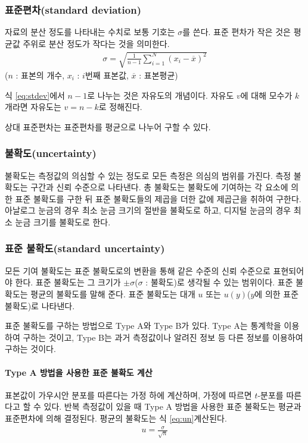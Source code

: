 \documentclass{GSHS-chemexp}
\begin{document}
	\subsubsection{\boldmath 표준편차(standard deviation)}
	자료의 분산 정도를 나타내는 수치로 보통 기호는 $\sigma$를 쓴다.
	표준 편차가 작은 것은 평균값 주위로 분산 정도가 작다는 것을 의미한다.
	\begin{gather}
	\sigma = \sqrt{
		\frac{1}{n-1}\sum_{i=1}^{N}(x_{i}-\overline{x})^{2}
	} \label{eq:stdev}
	\end{gather}
	($n$ : 표본의 개수, $x_{i}$ : $i$번째 표본값,
	$\overline{x}$ : 표본평균)
	
	식 \ref{eq:stdev}에서 $n-1$로 나누는 것은 자유도의 개념이다.
	자유도 $v$에 대해 모수가 $k$개라면 자유도는 $v = n - k$로 정해진다.
	\cite{deg_free}
	
	상대 표준편차는 표준편차를 평균으로 나누어 구할 수 있다.
	
	\subsubsection{불확도(uncertainty)}
	불확도는 측정값의 의심할 수 있는 정도로
	모든 측정은 의심의 범위를 가진다.
	측정 불확도는 구간과 신뢰 수준으로 나타낸다.
	총 불확도는 불확도에 기여하는 각 요소에 의한 표준 불확도를 구한 뒤
	표준 불확도들의 제곱을 더한 값에 제곱근을 취하여 구한다.
	\cite{Stephanie_Bell}
	아날로그 눈금의 경우 최소 눈금 크기의 절반을 불확도로 하고,
	디지털 눈금의 경우 최소 눈금 크기를 불확도로 한다.
	
	\subsubsection{표준 불확도(standard uncertainty)}
	모든 기여 불확도는 표준 불확도로의 변환을 통해 같은 수준의 신뢰 수준으로
	표현되어야 한다. 표준 불확도는 그 크기가 $\pm\sigma$($\sigma$ : 불확도)로
	생각될 수 있는 범위이다. 표준 불확도는 평균의 불확도를 말해 준다.
	표준 불확도는 대개 $u$ 또는 $u(y)$($y$에 의한 표준 불확도)로 나타낸다.
	
	표준 불확도를 구하는 방법으로 Type A와 Type B가 있다.
	Type A는 통계학을 이용하여 구하는 것이고,
	Type B는 과거 측정값이나 알려진 정보 등 다른 정보를 이용하여 구하는 것이다.
	\cite{Stephanie_Bell}
			
	\paragraph{Type A 방법을 사용한 표준 불확도 계산}
	표본값이 가우시안 분포를 따른다는 가정 하에 계산하며,
	가정에 따르면 $t$-분포를 따른다고 할 수 있다.
	반복 측정값이 있을 때 Type A 방법을 사용한 표준 불확도는
	평균과 표준편차에 의해 결정된다. 평균의 불확도는
	식 \ref{eq:un}\로 계산된다.
	\begin{gather}
	u = \frac{\sigma}{\sqrt{n}} \label{eq:un}
	\end{gather}
	
\end{document}
